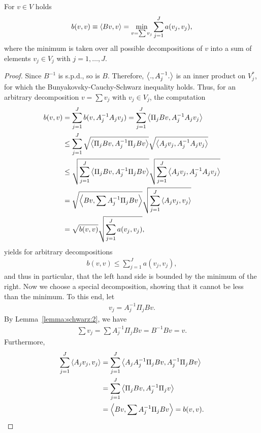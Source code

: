\begin{lemma}
  \label{lemma:schwarz:5}
  For $v\in V$ holds
  \begin{gather}
    \label{eq:schwarz:5}
    b(v,v) \equiv \scal(B v,v) = \min_{v=\sum v_j} \sum_{j=1}^J a(v_j,v_j),
  \end{gather}
  where the minimum is taken over all possible decompositions of $v$
  into a sum of elements $v_j\in V_j$ with $j=1,\dots,J$.
\end{lemma}

\begin{proof}
  Since $B^{-1}$ is s.p.d., so is $B$. Therefore, $\scal(.,A_j^{-1}.)$
  is an inner product on $V_j^*$, for which the Bunyakovsky-Cauchy-Schwarz
  inequality holds. Thus, for an arbitrary decomposition $v=\sum v_j$
  with $v_j\in V_j$, the computation
  \begin{align*}
    b(v,v)
    &= \sum_{j=1}^J b(v, A_j^{-1} A_j v_j)
    = \sum_{j=1}^J \scal(\Pi_j B v, A_j^{-1} A_j v_j) \\
    &\le \sum_{j=1}^J \sqrt{\scal(\Pi_j B v, A_j^{-1}\Pi_j B v)}
    \sqrt{\scal(A_j v_j, A_j^{-1}A_j v_j)} \\
    & \le \sqrt{\sum_{j=1}^J \scal(\Pi_j B v, A_j^{-1}\Pi_j
      B v) }
    \sqrt{\sum_{j=1}^J \scal(A_j v_j,A_j^{-1}A_j v_j)} \\
    &= \sqrt{\scal(B v, {\sum A_j^{-1}\Pi_j} B v)}
    \sqrt{\sum_{j=1}^J \scal(A_j v_j, v_j)} \\
    &= \sqrt{b(v,v)} \sqrt{\sum_{j=1}^J a(v_j, v_j)},
  \end{align*}
  yields for arbitrary decompositions
  \begin{gather}
    \label{eq:schwarz:17}
    b(v,v) \le \sum_{j=1}^J a(v_j, v_j),
  \end{gather}
  and thus in particular, that the left hand side is bounded by the
  minimum of the right. Now we choose a special decomposition, showing
  that it cannot be less than the minimum. To this end, let
  \begin{gather}
    \label{eq:schwarz:18}
    v_j = A_j^{-1} \Pi_j B v.
  \end{gather}
  By Lemma~\ref{lemma:schwarz:2}, we have
  \begin{gather*}
    \sum v_j = \sum A_j^{-1} \Pi_j B v = B^{-1} B v = v.
  \end{gather*}
  Furthermore,
  \begin{align*}
    \sum_{j=1}^J \scal(A_j v_j, v_j)
    &= \sum_{j=1}^J \scal(A_j A_j^{-1} \Pi_j B v, A_j^{-1} \Pi_j
    B v) \\
    &= \sum_{j=1}^J \scal(\Pi_j B v, A_j^{-1} \Pi_j v) \\
    &= \scal(B v, \sum A_j^{-1} \Pi_j B v) = b(v, v).
  \end{align*}
\end{proof}

